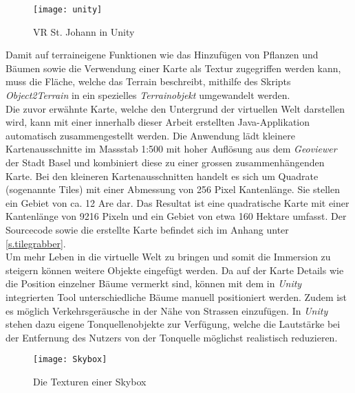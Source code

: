\begin{figure}[hbt]
	\vspace{-25pt}
	\begin{center}
		\texttt{[image: unity]}
	\end{center}
	\vspace{-15pt}
	\caption{VR St. Johann in Unity}\label{unity}
	\vspace{-15pt}
\end{figure}

Damit auf terraineigene Funktionen wie das Hinzufügen von Pflanzen und Bäumen sowie die Verwendung einer Karte als Textur zugegriffen werden kann, muss die Fläche, welche das Terrain beschreibt, mithilfe des Skripts \textit{Object2Terrain}\cite{website:terrain} in ein spezielles \textit{Terrainobjekt} umgewandelt werden.\\[6pt]
Die zuvor erwähnte Karte, welche den Untergrund der virtuellen Welt darstellen wird, kann mit einer innerhalb dieser Arbeit erstellten Java-Applikation automatisch zusammengestellt werden. Die Anwendung lädt kleinere Kartenausschnitte im Massstab 1:500 mit hoher Auflösung aus dem \textit{Geoviewer} der Stadt Basel und kombiniert diese zu einer grossen zusammenhängenden Karte. Bei den kleineren Kartenausschnitten handelt es sich um Quadrate (sogenannte Tiles) mit einer Abmessung von 256 Pixel Kantenlänge. Sie stellen ein Gebiet von ca. 12 Are dar. Das Resultat ist eine quadratische Karte mit einer Kantenlänge von 9216 Pixeln und ein Gebiet von etwa 160 Hektare umfasst. Der Sourcecode sowie die erstellte Karte befindet sich im Anhang unter \ref{s.tilegrabber}.\\[6pt]
Um mehr Leben in die virtuelle Welt zu bringen und somit die Immersion zu steigern können weitere Objekte eingefügt werden. Da auf der Karte Details wie die Position einzelner Bäume vermerkt sind, können mit dem in \textit{Unity} integrierten Tool unterschiedliche Bäume manuell positioniert werden. Zudem ist es möglich Verkehrsgeräusche in der Nähe von Strassen einzufügen. In \textit{Unity} stehen dazu eigene Tonquellenobjekte zur Verfügung, welche die Lautstärke bei der Entfernung des Nutzers von der Tonquelle möglichst realistisch reduzieren.\\[6pt]
\vspace{-12pt}
\begin{wrapfigure}{r}{0.35\textwidth}
	\vspace{-30pt}
	\begin{center}
		\texttt{[image: Skybox]}
	\end{center}
	\vspace{-15pt}
	\captionsetup{width=0.28\textwidth}
	\caption{Die Texturen einer Skybox}
	\vspace{-20pt}
\end{wrapfigure}
